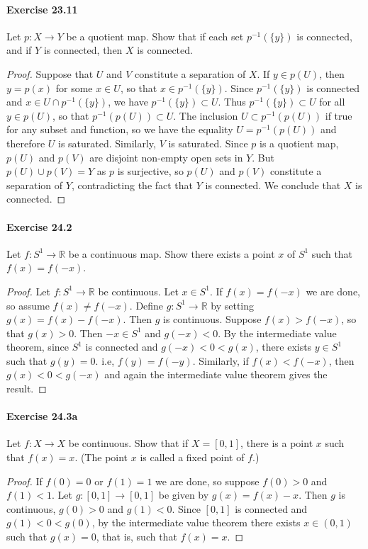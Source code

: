 \documentclass{article}
\begin{document}
\paragraph{Exercise 23.11} Let $p: X \rightarrow Y$ be a quotient map. Show that if each set $p^{-1}(\{y\})$ is connected, and if $Y$ is connected, then $X$ is connected.
\begin{proof}
    Suppose that $U$ and $V$ constitute a separation of $X$. If $y \in p(U)$, then $y=p(x)$ for some $x \in U$, so that $x \in p^{-1}(\{y\})$. Since $p^{-1}(\{y\})$ is connected and $x \in U \cap p^{-1}(\{y\})$, we have $p^{-1}(\{y\}) \subset U$. Thus $p^{-1}(\{y\}) \subset U$ for all $y \in p(U)$, so that $p^{-1}(p(U)) \subset U$. The inclusion $U \subset p^{-1}(p(U))$ if true for any subset and function, so we have the equality $U=p^{-1}(p(U))$ and therefore $U$ is saturated. Similarly, $V$ is saturated. Since $p$ is a quotient map, $p(U)$ and $p(V)$ are disjoint non-empty open sets in $Y$. But $p(U) \cup p(V)=Y$ as $p$ is surjective, so $p(U)$ and $p(V)$ constitute a separation of $Y$, contradicting the fact that $Y$ is connected. We conclude that $X$ is connected.
\end{proof}



\paragraph{Exercise 24.2} Let $f: S^{1} \rightarrow \mathbb{R}$ be a continuous map. Show there exists a point $x$ of $S^{1}$ such that $f(x)=f(-x)$.
\begin{proof}
    Let $f: S^1 \rightarrow \mathbb{R}$ be continuous. Let $x \in S^1$. If $f(x)=f(-x)$ we are done, so assume $f(x) \neq f(-x)$. Define $g: S^1 \rightarrow \mathbb{R}$ by setting $g(x)=f(x)-f(-x)$. Then $g$ is continuous. Suppose $f(x)>f(-x)$, so that $g(x)>0$. Then $-x \in S^1$ and $g(-x)<0$. By the intermediate value theorem, since $S^1$ is connected and $g(-x)<0<g(x)$, there exists $y \in S^1$ such that $g(y)=0$. i.e, $f(y)=f(-y)$. Similarly, if $f(x)<f(-x)$, then $g(x)<0<g(-x)$ and again the intermediate value theorem gives the result.
\end{proof}



\paragraph{Exercise 24.3a} Let $f \colon X \rightarrow X$ be continuous. Show that if $X = [0, 1]$, there is a point $x$ such that $f(x) = x$. (The point $x$ is called a fixed point of $f$.)
\begin{proof}
    If $f(0)=0$ or $f(1)=1$ we are done, so suppose $f(0)>0$ and $f(1)<1$. Let $g:[0,1] \rightarrow[0,1]$ be given by $g(x)=f(x)-x$. Then $g$ is continuous, $g(0)>0$ and $g(1)<0$. Since $[0,1]$ is connected and $g(1)<0<g(0)$, by the intermediate value theorem there exists $x \in(0,1)$ such that $g(x)=0$, that is, such that $f(x)=x$.
\end{proof}
\end{document}
